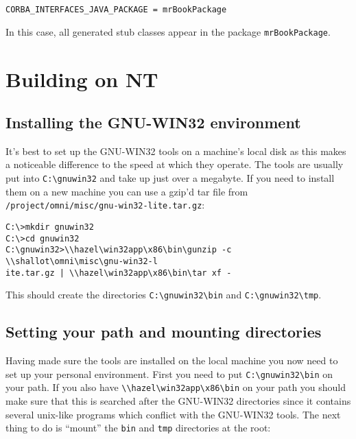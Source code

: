 \documentclass[11pt,twoside,onecolumn]{article}
\begin{document}
{\footnotesize \begin{verbatim}
CORBA_INTERFACES_JAVA_PACKAGE = mrBookPackage
\end{verbatim}}

In this case, all generated stub classes appear in the package
\verb|mrBookPackage|.

\section{Building on NT}

\subsection{Installing the GNU-WIN32 environment}

It's best to set up the GNU-WIN32 tools on a machine's local disk as this makes
a noticeable difference to the speed at which they operate.  The tools are
usually put into \verb|C:\gnuwin32| and take up just over a megabyte.  If you
need to install them on a new machine you can use a gzip'd tar file from
\verb|/project/omni/misc/gnu-win32-lite.tar.gz|:

{\footnotesize \begin{verbatim}
C:\>mkdir gnuwin32
C:\>cd gnuwin32
C:\gnuwin32>\\hazel\win32app\x86\bin\gunzip -c \\shallot\omni\misc\gnu-win32-l
ite.tar.gz | \\hazel\win32app\x86\bin\tar xf -
\end{verbatim}}

This should create the directories \verb|C:\gnuwin32\bin| and
\verb|C:\gnuwin32\tmp|.

\subsection{Setting your path and mounting directories}

Having made sure the tools are installed on the local machine you now need to
set up your personal environment.  First you need to put \verb|C:\gnuwin32\bin|
on your path.  If you also have \verb|\\hazel\win32app\x86\bin| on your path
you should make sure that this is searched after the GNU-WIN32 directories
since it contains several unix-like programs which conflict with the GNU-WIN32
tools.  The next thing to do is ``mount'' the {\tt bin} and {\tt tmp}
directories at the root:
\end{document}
